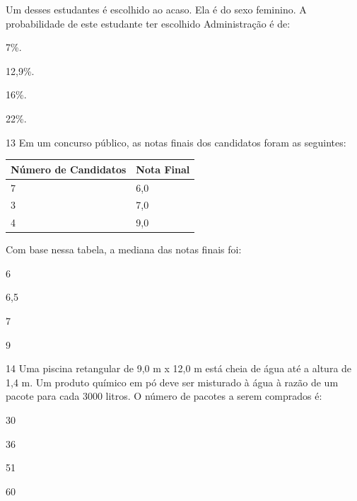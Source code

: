 Um desses estudantes é escolhido ao acaso. Ela é do sexo
feminino. A probabilidade de este estudante ter escolhido Administração
é de:

\begin{escolha}

  \item 7\%.

  \item 12,9\%.

  \item 16\%.

  \item 22\%.

\end{escolha}


\num{13} Em um concurso público, as notas finais dos candidatos foram
as seguintes:

\begin{longtable}[]{@{}ll@{}}
\toprule
Número de Candidatos & Nota Final\tabularnewline
\midrule
\endhead
7 & 6,0\tabularnewline
3 & 7,0\tabularnewline
4 & 9,0\tabularnewline
\bottomrule
\end{longtable}

Com base nessa tabela, a mediana das notas finais foi:

\begin{escolha}

  \item 6

  \item 6,5

  \item 7

  \item 9

\end{escolha}

\pagebreak
\num{14} Uma piscina retangular de 9,0 m x 12,0 m está cheia de água até 
a altura de 1,4 m. Um produto químico em pó deve ser misturado à água à razão
de um pacote para cada 3000 litros. O número de pacotes a serem comprados é:

\begin{escolha}

  \item 30

  \item 36

  \item 51

  \item 60

\end{escolha}

